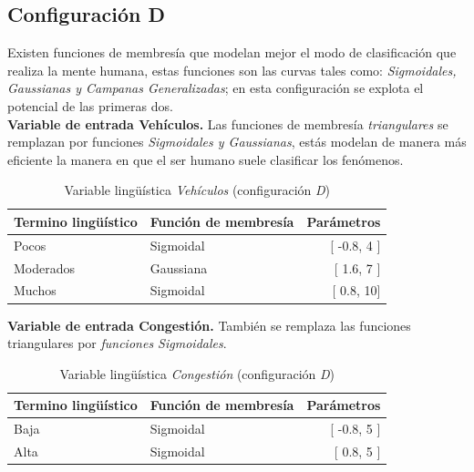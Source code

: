 \subsection{Configuración D}\label{section:configd}
Existen funciones de membresía que modelan mejor el modo de clasificación que realiza la mente humana, estas funciones son las curvas tales como: \textit{Sigmoidales, Gaussianas y Campanas Generalizadas}; en esta configuración se explota el potencial de las primeras dos.\\

\textbf{Variable de entrada Vehículos.} Las funciones de membresía \textit{triangulares} se remplazan por funciones \textit{Sigmoidales y Gaussianas}, estás modelan de manera más eficiente la manera en que el ser humano suele clasificar los fenómenos.\\

\begin{table}[!h]
	\centering
	\begin{tabular}{llr} \toprule
		Termino lingüístico & Función de membresía & Parámetros \\ \midrule
		Pocos & Sigmoidal & [ -0.8, 4 ] \\
		Moderados & Gaussiana & [ 1.6, 7 ] \\
		Muchos & Sigmoidal & [ 0.8, 10] \\ \bottomrule
	\end{tabular}
	\caption{Variable lingüística \textit{Vehículos} (configuración \textit{D})}
\end{table}


\textbf{Variable de entrada Congestión.} También se remplaza las funciones triangulares por \textit{funciones Sigmoidales}.\\

\begin{table}[!h]
	\centering
	\begin{tabular}{llr} \toprule
		Termino lingüístico & Función de membresía & Parámetros \\ \midrule
		Baja & Sigmoidal & [ -0.8, 5 ] \\
		Alta & Sigmoidal & [ 0.8, 5 ] \\ \bottomrule
	\end{tabular}
	\caption{Variable lingüística \textit{Congestión} (configuración \textit{D})}
\end{table}

